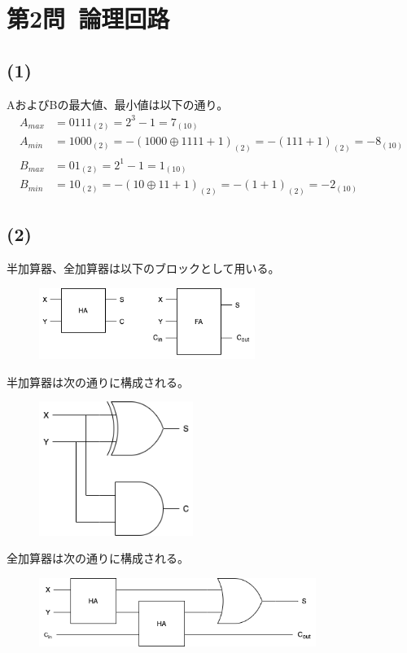 \documentclass[a4paper,12pt,xelatex,ja=standard]{bxjsarticle}
\begin{document}
\section*{第2問\ 論理回路}
  \subsection*{(1)}
  AおよびBの最大値、最小値は以下の通り。
  \begin{equation*}
    \begin{split}
      A_{max} &= 0111_{(2)} = 2^3 - 1 = 7_{(10)} \\
      A_{min} &= 1000_{(2)} = -(1000 \oplus 1111 + 1)_{(2)} = -(111 + 1)_{(2)} = -8_{(10)} \\
      B_{max} &= 01_{(2)} = 2^1 - 1 = 1_{(10)} \\
      B_{min} &= 10_{(2)} = -(10 \oplus 11 + 1)_{(2)} = -(1 + 1)_{(2)} = -2_{(10)}
    \end{split}
  \end{equation*}

  \subsection*{(2)}
  半加算器、全加算器は以下のブロックとして用いる。
  \begin{figure}[H]
    \centering
    \includegraphics[width=7cm]{images/ha_and_fa.png}
  \end{figure}

  半加算器は次の通りに構成される。
  \begin{figure}[H]
    \centering
    \includegraphics[width=5cm]{images/half_adder.png}
  \end{figure}

  全加算器は次の通りに構成される。
  \begin{figure}[H]
    \centering
    \includegraphics[width=9cm]{images/full_adder.png}
  \end{figure}
\end{document}
